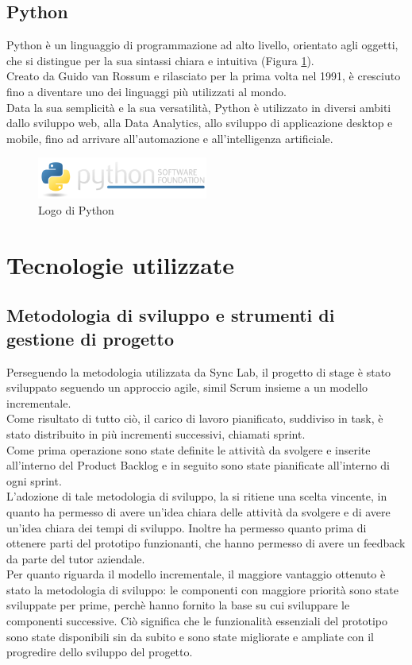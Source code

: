 \subsection{Python}
Python è un linguaggio di programmazione ad alto livello, orientato agli oggetti,
che si distingue per la sua sintassi chiara e intuitiva (Figura \ref{fig:python}).\\
Creato da Guido van Rossum e rilasciato per la prima volta nel 1991, è cresciuto fino a 
diventare uno dei linguaggi più utilizzati al mondo.\\
Data la sua semplicità e la sua versatilità, Python è utilizzato in diversi ambiti dallo sviluppo web, alla \gls{Data Analytics}{}, allo sviluppo di applicazione 
desktop e mobile, fino ad arrivare all'automazione e all'intelligenza artificiale.\\
\begin{figure}[hpp]
    \centering
    \includegraphics[width=0.5\textwidth]{images/tecnologie/logo_python.png}
    \caption{Logo di Python}
    \label{fig:python}
\end{figure}
\section{Tecnologie utilizzate}
\subsection{Metodologia di sviluppo e strumenti di gestione di progetto}
Perseguendo la metodologia utilizzata da Sync Lab, il progetto di stage è stato sviluppato seguendo un
approccio \gls{agile}{}, simil \gls{Scrum}{} insieme a un \gls{modello incrementale}{}.\\ 
Come risultato di tutto ciò, il carico di lavoro pianificato, suddiviso in task, è stato distribuito in più incrementi successivi, 
chiamati \gls{sprint}{}.\\
Come prima operazione sono state definite le attività da svolgere e inserite all'interno del \gls{Product Backlog}{} e in seguito 
sono state pianificate all'interno di ogni \gls{sprint}{}.\\
L'adozione di tale metodologia di sviluppo, la si ritiene una scelta vincente, in quanto ha permesso di avere un'idea chiara
delle attività da svolgere e di avere un'idea chiara dei tempi di sviluppo. Inoltre ha permesso quanto prima di ottenere 
parti del prototipo funzionanti, che hanno permesso di avere un feedback da parte del tutor aziendale.\\
Per quanto riguarda il \gls{modello incrementale}{}, il maggiore vantaggio ottenuto è stato la metodologia di sviluppo: le componenti 
con maggiore priorità sono state sviluppate per prime, perchè hanno fornito la base su cui sviluppare le componenti successive. Ciò significa che 
le funzionalità essenziali del prototipo sono state disponibili sin da subito e sono state migliorate e ampliate con il progredire dello sviluppo del progetto.
